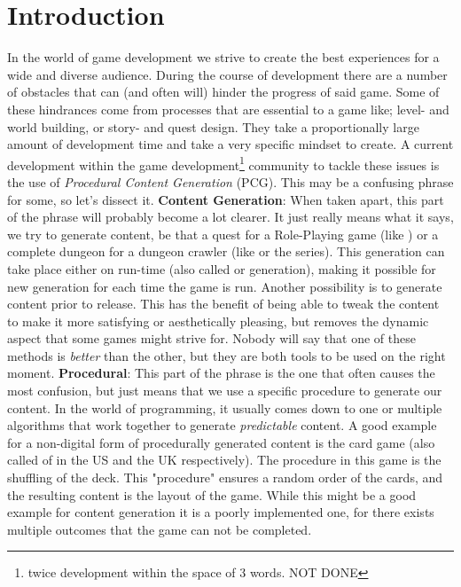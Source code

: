 
\chapter{Introduction}
In the world of game development we strive to create the best experiences for a wide and diverse audience. During the course of development there are a number of obstacles that can (and often will) hinder the progress of said game. Some of these hindrances come from processes that are essential to a game like; level- and world building, or story- and quest design. They take a proportionally large amount of development time and take a very specific mindset to create. 
A current development within the game development\footnote{twice development within the space of 3 words. NOT DONE} community to tackle these issues is the use of \textit{Procedural Content Generation} (PCG). This may be a confusing phrase for some, so let's dissect it. 
\textbf{Content Generation}: When taken apart, this part of the phrase will probably become a lot clearer. It just really means what it says, we try to generate content, be that a quest for a Role-Playing game (like ) or a complete dungeon for a dungeon crawler (like  or the  series). This generation can take place either on run-time (also called  or  generation), making it possible for new generation for each time the game is run. Another possibility is to generate content prior to release. This has the benefit of being able to tweak the content to make it more satisfying or aesthetically pleasing, but removes the dynamic aspect that some games might strive for. Nobody will say that one of these methods is \emph{better} than the other, but they are both tools to be used on the right moment.
\textbf{Procedural}: This part of the phrase is the one that often causes the most confusion, but just means that we use a specific procedure to generate our content. In the world of programming, it usually comes down to one or multiple algorithms that work together to generate \emph{predictable} content. A good example for a non-digital form of procedurally generated content is the card game  (also called  of  in the US and the UK respectively). The procedure in this game is the shuffling of the deck. This "procedure" ensures a random order of the cards, and the resulting content is the layout of the game. While this might be a good example for content generation it is a poorly implemented one, for there exists multiple outcomes that the game can not be completed.

